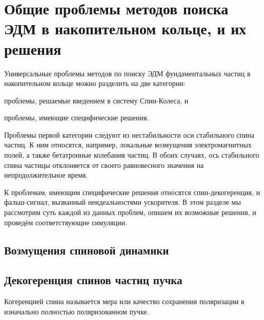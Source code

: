 

\chapter{Общие проблемы методов поиска ЭДМ в накопительном кольце, и их решения} \label{chpt3:top-level}
 
Универсальные проблемы методов по поиску ЭДМ фундаментальных частиц в накопительном кольце можно разделить на 
две категории:
\begin{enumerate*}
	\item проблемы, решаемые введением в систему Спин-Колеса, и
	\item проблемы, имеющие специфические решения.
\end{enumerate*}

Проблемы первой категории следуют из нестабильности оси стабильного спина частиц. К ним относятся, например, 
локальные возмущения электромагнитных полей, а также бетатронные колебания частиц. В обоих случаях, ось стабильного спина частицы отклоняется от своего равновесного значения на непродолжительное время.

К проблемам, имеющим специфические решения относятся спин-декогеренция, и фальш-сигнал, вызванный 
неидеальностями ускорителя. В этом разделе мы рассмотрим суть каждой из данных проблем, опишем их возможные
решения, и проведём соответствующие симуляции.
  
\section{Возмущения спиновой динамики}\label{chpt3:smp}


\section{Декогеренция спинов частиц пучка}\label{chpt3:decoherence}
Когеренцией спина называется мера или качество сохранения поляризации
в изначально полностью поляризованном пучке.~\cite[стр.~205]{Eremey:Thesis}

